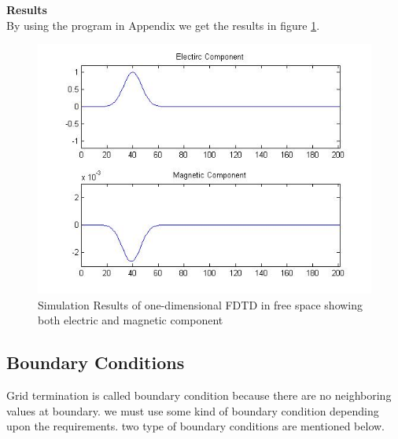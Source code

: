 \textbf{Results}\\
By using the program in Appendix %
we get the results in figure \ref{fig:fdtdpc}.
\begin{figure}[htbp]
	\centering
		\includegraphics[width=5in]{Figures/free.jpg}
	\caption[Simulation Result of 1 dimensional FDTD in free space]{Simulation Results of one-dimensional FDTD in free space showing both electric and magnetic component}
	\label{fig:fdtdpc}
\end{figure}
\subsection{Boundary Conditions}
Grid termination is called boundary condition because there are no neighboring values at boundary. we must use some kind of boundary condition depending upon the requirements. two type of boundary conditions are mentioned below.
